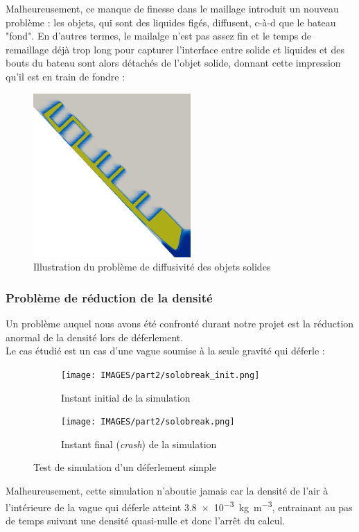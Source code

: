 \documentclass[../main.tex]{subfiles}
\begin{document}
Malheureusement, ce manque de finesse dans le maillage introduit un nouveau problème : les objets, qui sont des liquides figés, diffusent, c-à-d que le bateau "fond". En d'autres termes, le mailalge n'est pas assez fin et le temps de remaillage déjà trop long pour capturer l'interface entre solide et liquides et des bouts du bateau sont alors détachés de l'objet solide, donnant cette impression qu'il est en train de fondre :
\begin{figure}[H]
    \centering
    \includegraphics[width=6cm]{IMAGES/part2/zephyr_launching.0008.png}
    \caption{Illustration du problème de diffusivité des objets solides}
\end{figure}

\subsubsection*{Problème de réduction de la densité}
Un problème auquel nous avons été confronté durant notre projet est la réduction anormal de la densité lors de déferlement.\\
Le cas étudié est un cas d'une vague soumise à la seule gravité qui déferle :
\begin{figure}
\centering
\begin{subfigure}[b]{11cm}
    \centering
    \texttt{[image: IMAGES/part2/solobreak\_init.png]}
    \caption{Instant initial de la simulation}
\end{subfigure}
\vfill
\begin{subfigure}[b]{11cm}
    \centering
    \texttt{[image: IMAGES/part2/solobreak.png]}
    \caption{Instant final (\textit{crash}) de la simulation}
\end{subfigure}
\caption{Test de simulation d'un déferlement simple}
\end{figure}

Malheureusement, cette simulation n'aboutie jamais car la densité de l'air à l'intérieure de la vague qui déferle atteint \qty{3.8e-3}{\kilogram\per\cubic\meter}, entrainant au pas de temps suivant une densité quasi-nulle et donc l'arrêt du calcul.\\
\end{document}
